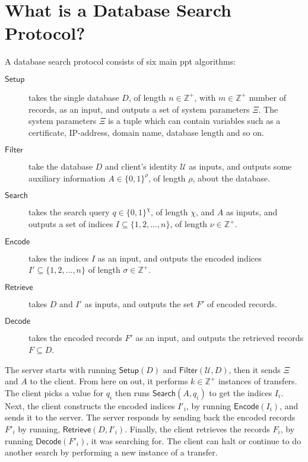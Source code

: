 \section{What is a Database Search Protocol?}
\label{sec:PDSwhatisaDSprotocol}


\newcommand{\Setup}{\ensuremath{\mathsf{{Setup}}}}
\newcommand{\Filter}{\ensuremath{\mathsf{{Filter}}}}
\newcommand{\Search}{\ensuremath{\mathsf{{Search}}}}
\newcommand{\Encode}{\ensuremath{\mathsf{{Encode}}}}
\newcommand{\Retrieve}{\ensuremath{\mathsf{{Retrieve}}}}
\newcommand{\Decode}{\ensuremath{\mathsf{{Decode}}}}

A database search protocol consists of six main \acrfull{ppt} algorithms:
\begin{description}
    \item[$ \Setup $] takes the single database $ D $, of length $ n \in \mathbb{Z}^+ $, with $ m \in \mathbb{Z}^+ $ number of records, as an input, and outputs a set of system parameters $ \Xi $. The system parameters $ \Xi $ is a tuple which can contain variables such as a certificate, IP-address, domain name, database length and so on.
    \item[$ \Filter $] take the database $ D $ and client's identity $ \mathcal{U} $ as inputs, and outputs some auxiliary information $ A \in {\lbrace 0, 1 \rbrace}^\rho $, of length $ \rho $, about the database.
    \item[$ \Search $] takes the search query $ q \in {\lbrace 0, 1 \rbrace}^\chi $, of length $ \chi $, and $ A $ as inputs, and outputs a set of indices $ I \subseteq {\lbrace 1, 2, ... , n \rbrace} $, of length $ \nu \in \mathbb{Z}^+ $.
    \item[$ \Encode $] takes the indices $ I $ as an input, and outputs the encoded indices $ I' \subseteq {\lbrace 1, 2, ... , n \rbrace} $ of length $ \sigma \in \mathbb{Z}^+ $.
    \item[$ \Retrieve $] takes $ D $ and $ I' $ as inputs, and outputs the set $ F' $ of encoded records.
    \item[$ \Decode $] takes the encoded records $ F' $ as an input, and outputs the retrieved records $ F \subseteq D $.
\end{description}

The server starts with running $ \Setup \left( D \right) $ and $ \Filter \left( \mathcal{U}, D \right) $, then it sends $ \Xi $ and $ A $ to the client. From here on out, it performs $ k \in \mathbb{Z}^+ $ instances of transfers. The client picks a value for $ q_i $ then runs $ \Search \left( A, q_i \right) $ to get the indices $ I_i $. Next, the client constructs the encoded indices $ I'_i $, by running $ \Encode \left( I_i \right) $, and sends it to the server. The server responds by sending back the encoded records $ F'_i $ by running, $ \Retrieve \left( D, I'_i \right) $. Finally, the client retrieves the records $ F_i $, by running $ \Decode \left( F'_i \right) $, it was searching for. The client can halt or continue to do another search by performing a new instance of a transfer. 

